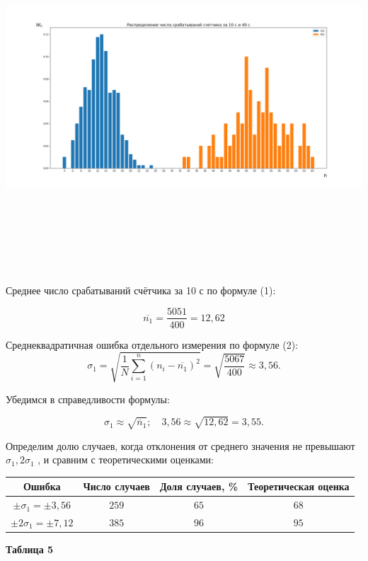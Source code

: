 \begin{center}
    \includegraphics[width=22cm, height=13cm, angle=90]{dist_10_40.png}
\end{center}



Среднее число срабатываний счётчика за 10 с по формуле (1):


\[\overline{n_1} = \frac{5051}{400} = 12,62\]


Среднеквадратичная ошибка отдельного измерения по формуле (2):
\[\sigma_1 = \sqrt{\frac{1}{N}\sum\limits_{i=1}^n (n_i-\overline{n_1})^2} = \sqrt{\frac{5067}{400}} \approx 3,56.\]


Убедимся в справедливости формулы:


\[\sigma_1 \approx \sqrt{\overline{n}_1};\quad 3,56 \approx \sqrt{12,62} = 3,55.\]


Определим долю случаев, когда отклонения от среднего значения не превышают $\sigma_1, 2\sigma_1$
, и сравним с теоретическими оценками:

\begin{center}
    \begin{tabular}{|c|c|c|c|}
        \hline
        Ошибка                   & Число случаев & Доля случаев, \% & Теоретическая оценка \\
        \hline
        $\pm\sigma_1 = \pm3,56$  & $259$         & $65$             & $68$                 \\
        \hline
        $\pm2\sigma_1 = \pm7,12$ & $385$         & $96$             & $95$                 \\
        \hline
    \end{tabular}
\end{center}
\begin{flushright}
    {\scriptsize \textbf{Таблица 5} }
\end{flushright}


